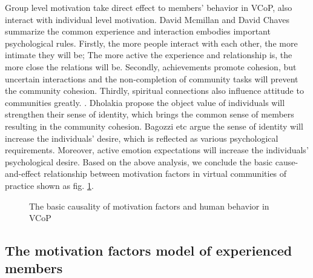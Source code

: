 \documentclass[doublespacing]{elsarticle}
\begin{document}
 Group  level motivation take direct effect to members' behavior in
 VCoP,  also interact with individual
level motivation. David Mcmillan and David
Chaves summarize  the common experience and interaction embodies
important psychological rules. Firstly, the more people interact with each
other, the more intimate they will be; The more active the experience
and relationship is, the more close the relations will
be. Secondly, achievements promote cohesion, but uncertain
interactions and the non-completion of community tasks will prevent
the community cohesion. Thirdly, spiritual connections  also
influence attitude to communities greatly. 
\cite{mcmillan1986scd}. Dholakia propose the object value of individuals will
strengthen their sense of identity, which brings the common sense of
members resulting in the community
cohesion\cite{dholakia2004241}. Bagozzi etc argue the sense of identity will increase the
individuals' desire, which is reflected as various psychological
requirements. Moreover, active
emotion expectations will increase the individuals' psychological
desire\cite{richard_p._bagozzi_intentional_2002}.  Based on the above analysis, we conclude the basic
cause-and-effect relationship between motivation factors in virtual
communities of practice shown as fig. \ref{fig:cause-and-effect}.
\begin{figure}[htpb]
  \centering

  \caption{The basic causality of
    motivation factors and human behavior in VCoP}
  \label{fig:cause-and-effect}
\end{figure}

\subsection{The motivation factors model of experienced members}
\label{sec:motiv-fact-model}
\end{document}
